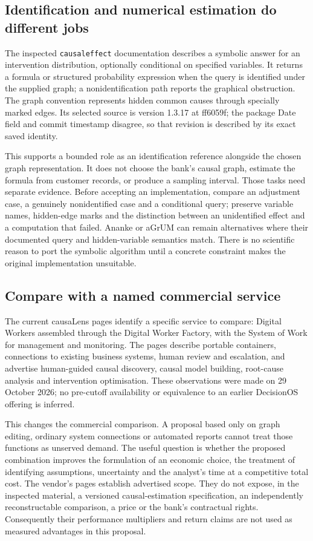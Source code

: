 \subsection{Identification and numerical estimation do different jobs}
The inspected \texttt{causaleffect} documentation describes a symbolic answer
for an intervention distribution, optionally conditional on specified variables.
It returns a formula or structured probability expression when the query is
identified under the supplied graph; a nonidentification path reports the
graphical obstruction. The graph convention represents hidden common causes
through specially marked edges. Its selected source is version 1.3.17 at
ff6059f; the package Date field and commit timestamp disagree, so that
revision is described by its exact saved identity. \citep{exec18_rid_causaleffect}

This supports a bounded role as an identification reference alongside the
chosen graph representation. It does not choose the bank's causal graph,
estimate the formula from customer records, or produce a sampling interval.
Those tasks need separate evidence. Before accepting an implementation, compare
an adjustment case, a genuinely nonidentified case and a conditional query;
preserve variable names, hidden-edge marks and the distinction between an
unidentified effect and a computation that failed. Ananke or aGrUM can remain
alternatives where their documented query and hidden-variable semantics match.
There is no scientific reason to port the symbolic algorithm until a concrete
constraint makes the original implementation unsuitable.

\subsection{Compare with a named commercial service}
The current causaLens pages identify a specific service to compare: Digital
Workers assembled through the Digital Worker Factory, with the System of Work
for management and monitoring. The pages describe portable containers,
connections to existing business systems, human review and escalation, and
advertise human-guided causal discovery, causal model building, root-cause
analysis and intervention optimisation. These observations were made on
29 October 2026; no pre-cutoff availability or equivalence to an earlier
DecisionOS offering is inferred. \citep{survey29causalens}

This changes the commercial comparison. A proposal based only on graph editing,
ordinary system connections or automated reports cannot treat those functions
as unserved demand. The useful question is whether the proposed combination
improves the formulation of an economic choice, the treatment of identifying
assumptions, uncertainty and the analyst's time at a competitive total cost.
The vendor's pages establish advertised scope. They do not expose, in the
inspected material, a versioned causal-estimation specification, an independently
reconstructable comparison, a price or the bank's contractual rights.
Consequently their performance multipliers and return claims are not used as
measured advantages in this proposal. \citep{survey29causalens}

